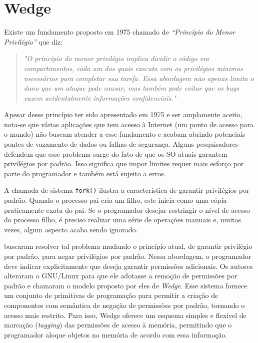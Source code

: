 \section{Wedge}

Existe um fundamento proposto em 1975 chamado de \emph{``Princípio do Menor
Privilégio''} que diz:

\begin{quote}
\emph{"O princípio do menor privilégio implica dividir o código em compartimentos,
cada um dos quais executa com os privilégios mínimos necessários para completar
sua tarefa. Essa abordagem não apenas limita o dano que um ataque pode causar,
mas também pode evitar que os \emph{bugs} vazem acidentalmente informações
confidenciais."} \citep{protectionprinciple}
\end{quote}

Apesar desse princípio ter sido apresentado em 1975 e ser amplamente aceito,
nota-se que várias aplicações que tem acesso à Internet (um ponto de acesso
para o mundo) não buscam atender a esse fundamento e acabam abrindo
potenciais pontes de vazamento de dados ou falhas de segurança. Alguns
pesquisadores defendem que esse problema surge do fato de que os SO atuais
garantem privilégios por padrão. Isso significa que impor limites requer mais
esforço por parte do programador e também está sujeito a erros.

A chamada de sistema \texttt{fork()} ilustra a característica de garantir
privilégios por padrão. Quando o processo pai cria um filho, este inicia como
uma cópia praticamente exata do pai. Se o programador desejar restringir o
nível de acesso do processo filho, é preciso realizar uma série de operações
manuais e, muitas vezes, algum aspecto acaba sendo ignorado.

\citet{wedge} buscaram resolver tal problema mudando o princípio atual, de
garantir privilégio por padrão, para negar privilégios por padrão. Nessa
abordagem, o programador deve indicar explicitamente que deseja garantir
permissões adicionais. Os autores alteraram o GNU/Linux para que ele
adotasse a remoção de permissões por padrão e chamaram o modelo proposto por
eles de \emph{Wedge}. Esse sistema fornece um conjunto de primitivas de
programação para permitir a criação de componentes com semântica de negação de permissões
por padrão, tornando o acesso mais restrito. Para isso, Wedge oferece
um esquema simples e flexível de marcação (\emph{tagging}) das permissões de
acesso à memória, permitindo que o programador aloque objetos na memória de
acordo com essa informação.

